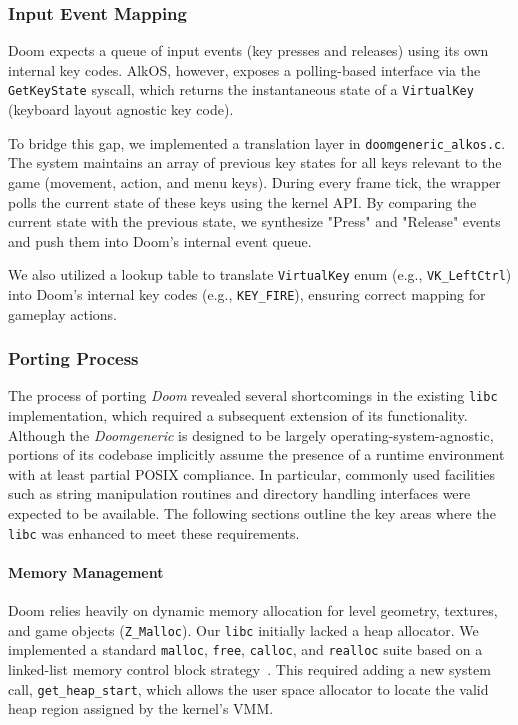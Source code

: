 \documentclass[a4paper,10pt,twoside]{report}
\theoremstyle{definition}
\begin{document}
\subsubsection{Input Event Mapping}

Doom expects a queue of input events (key presses and releases) using its own internal key codes. AlkOS, however, exposes a polling-based interface via the \texttt{GetKeyState} syscall, which returns the instantaneous state of a \texttt{VirtualKey} (keyboard layout agnostic key code).

To bridge this gap, we implemented a translation layer in \texttt{doomgeneric\_alkos.c}. The system maintains an array of previous key states for all keys relevant to the game (movement, action, and menu keys). During every frame tick, the wrapper polls the current state of these keys using the kernel API. By comparing the current state with the previous state, we synthesize "Press" and "Release" events and push them into Doom's internal event queue.

We also utilized a lookup table to translate \texttt{VirtualKey} enum (e.g., \texttt{VK\_LeftCtrl}) into Doom's internal key codes (e.g., \texttt{KEY\_FIRE}), ensuring correct mapping for gameplay actions.

\subsubsection{Porting Process}

The process of porting \textit{Doom} revealed several shortcomings in the existing \texttt{libc} implementation, which required a subsequent extension of its functionality. Although the \textit{Doomgeneric} is designed to be largely operating-system-agnostic, portions of its codebase implicitly assume the presence of a runtime environment with at least partial POSIX compliance. In particular, commonly used facilities such as string manipulation routines and directory handling interfaces were expected to be available. The following sections outline the key areas where the \texttt{libc} was enhanced to meet these requirements.

\paragraph{Memory Management}
Doom relies heavily on dynamic memory allocation for level geometry, textures, and game objects (\texttt{Z\_Malloc}). Our \texttt{libc} initially lacked a heap allocator. We implemented a standard \texttt{malloc}, \texttt{free}, \texttt{calloc}, and \texttt{realloc} suite based on a linked-list memory control block strategy~\cite{malloc-impl}. This required adding a new system call, \texttt{get\_heap\_start}, which allows the user space allocator to locate the valid heap region assigned by the kernel's VMM.
\end{document}
